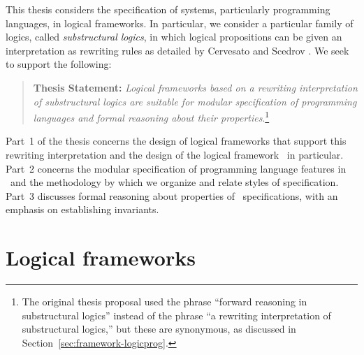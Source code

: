 This thesis considers the specification of systems, particularly
programming languages, in logical frameworks. In particular, we
consider a particular family of logics, called {\it substructural
  logics}, in which logical propositions can be given an
interpretation as rewriting rules as detailed by Cervesato and Scedrov
\cite{cervesato09relating}. %
We seek to support the
following:
\begin{quote} {\bf Thesis Statement:} {\it Logical frameworks based on
    a rewriting interpretation of substructural logics are suitable
    for modular specification of programming languages and formal
    reasoning about their properties}.\footnote{The original thesis
    proposal used the phrase ``forward reasoning in substructural
    logics'' instead of the phrase ``a rewriting interpretation of
    substructural logics,'' but these are synonymous, as discussed in
    Section~\ref{sec:framework-logicprog}.}
\end{quote}

\noindent
Part~1 of the thesis concerns the design of logical frameworks that
support this rewriting interpretation and the design of the logical
framework \sls~in particular. Part~2 concerns the modular
specification of programming language features in \sls~and the
methodology by which we organize and relate styles of
specification. Part~3 discusses formal reasoning about properties of
\sls~specifications, with an emphasis on establishing invariants.

\section{Logical frameworks}


